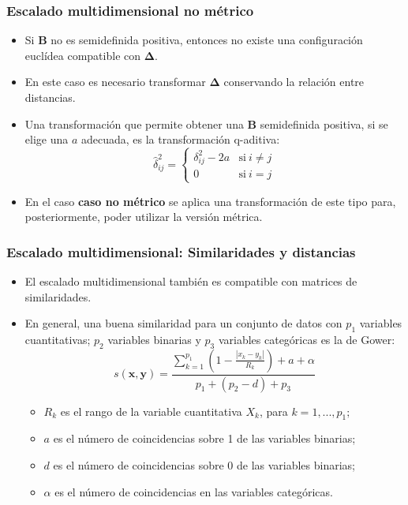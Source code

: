 \documentclass{beamer}
\begin{document}
\begin{frame}
\frametitle{Escalado multidimensional no métrico}

\begin{itemize}
    \item Si $\boldsymbol{B}$ no es semidefinida positiva, entonces no existe una configuración euclídea compatible con $\boldsymbol{\Delta}$.
    \item En este caso es necesario transformar $\boldsymbol{\Delta}$ conservando la relación entre distancias.
    \item Una transformación que permite obtener una $\boldsymbol{B}$ semidefinida positiva, si se elige una $a$ adecuada, es la transformación q-aditiva:
    \begin{equation*}
    \hat{\delta}_{ij}^2 = 
    \begin{cases}
      \delta_{ij}^2 - 2a & \text{si}\ i\neq j \\
      0  & \text{si}\ i=j
    \end{cases}
    \end{equation*}

    \item En el caso \textbf{caso no métrico} se aplica una transformación de este tipo para, posteriormente, poder utilizar la versión métrica.
\end{itemize}


\end{frame}

\begin{frame}
\frametitle{Escalado multidimensional: Similaridades y distancias}

\begin{itemize}
    \item El escalado multidimensional también es compatible con matrices de similaridades.
    \item En general, una buena similaridad para un conjunto de datos con $p_1$ variables cuantitativas; $p_2$ variables binarias y $p_3$ variables categóricas es la de Gower:
    \begin{equation*}
    s(\boldsymbol{x}, \boldsymbol{y}) = \frac{\sum_{k=1}^{p_1}(1-\frac{| x_{k} - y_{k}|}{R_k})  + a + \alpha }{p_1 + (p_2 -d)+p_3}
\end{equation*}

\begin{itemize}
    \item $R_k$ es el rango de la variable cuantitativa $X_k$, para $k=1,...,p_1;$
    \item $a$ es el número de coincidencias sobre 1 de las variables binarias;
    \item $d$ es el número de coincidencias sobre 0 de las variables binarias;
    \item $\alpha$ es el número de coincidencias en las variables categóricas.
\end{itemize}
\end{itemize}


\end{frame}
\end{document}
